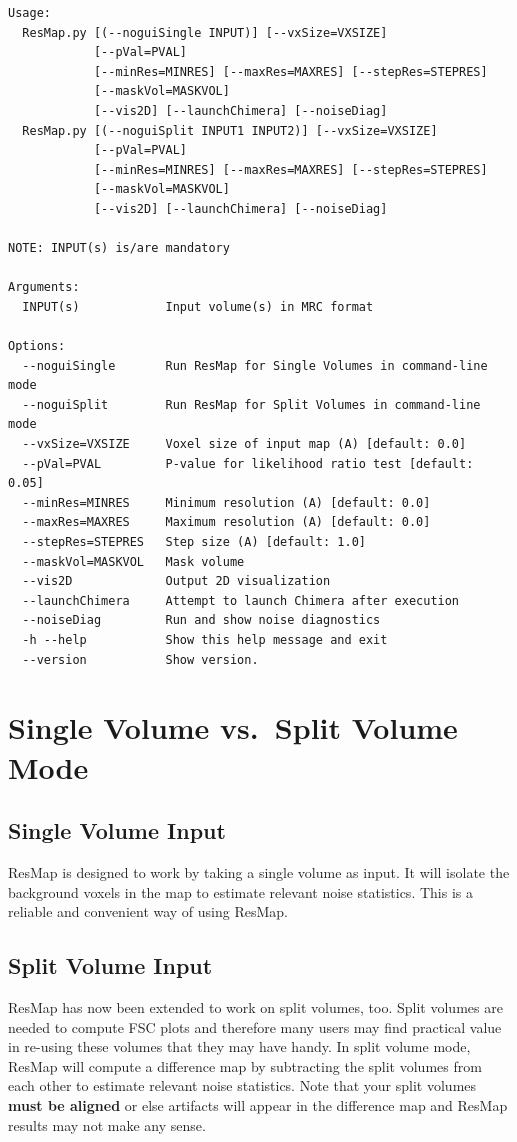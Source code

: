 \documentclass[10pt]{article}
\begin{document}
\begin{lstlisting}
Usage:
  ResMap.py [(--noguiSingle INPUT)] [--vxSize=VXSIZE]
            [--pVal=PVAL]
            [--minRes=MINRES] [--maxRes=MAXRES] [--stepRes=STEPRES]
            [--maskVol=MASKVOL]
            [--vis2D] [--launchChimera] [--noiseDiag]
  ResMap.py [(--noguiSplit INPUT1 INPUT2)] [--vxSize=VXSIZE]
            [--pVal=PVAL]
            [--minRes=MINRES] [--maxRes=MAXRES] [--stepRes=STEPRES]
            [--maskVol=MASKVOL]
            [--vis2D] [--launchChimera] [--noiseDiag]

NOTE: INPUT(s) is/are mandatory

Arguments:
  INPUT(s)            Input volume(s) in MRC format

Options:
  --noguiSingle       Run ResMap for Single Volumes in command-line mode
  --noguiSplit        Run ResMap for Split Volumes in command-line mode
  --vxSize=VXSIZE     Voxel size of input map (A) [default: 0.0]
  --pVal=PVAL         P-value for likelihood ratio test [default: 0.05]
  --minRes=MINRES     Minimum resolution (A) [default: 0.0]
  --maxRes=MAXRES     Maximum resolution (A) [default: 0.0]
  --stepRes=STEPRES   Step size (A) [default: 1.0]
  --maskVol=MASKVOL   Mask volume
  --vis2D             Output 2D visualization
  --launchChimera     Attempt to launch Chimera after execution
  --noiseDiag         Run and show noise diagnostics
  -h --help           Show this help message and exit
  --version           Show version.
\end{lstlisting}

\section{Single Volume vs.~Split Volume Mode}
\subsection{Single Volume Input}
ResMap is designed to work by taking a single volume as input. It will isolate the background voxels in the map to estimate relevant noise statistics. This is a reliable and convenient way of using ResMap.

\subsection{Split Volume Input}
ResMap has now been extended to work on split volumes, too. Split volumes are needed to compute FSC plots and therefore many users may find practical value in re-using these volumes that they may have handy. In split volume mode, ResMap will compute a difference map by subtracting the split volumes from each other to estimate relevant noise statistics. Note that your split volumes \textbf{must be aligned} or else artifacts will appear in the difference map and ResMap results may not make any sense.
\end{document}
